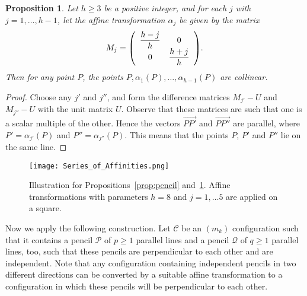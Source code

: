 \documentclass[reqno,12pt]{amsart}
\theoremstyle{plain}
\newtheorem{prop}[theorem]{Proposition}
\theoremstyle{definition}
\theoremstyle{remark}
\newcommand{\mc}[1]{\mathcal{#1}}
\newenvironment{matr}[1]{\left( \begin{array}{#1}}{\end{array}\right)}
\begin{document}
\begin{prop} \label{prop:series}
Let $h\ge3$ be a positive integer, and for each $j$ with $j=1,\dots,h-1$, let the affine transformation $\alpha_j$
be given by the matrix 
\begin{equation} \label{matrix}
M_j =
\begin{matr}{cc}
\displaystyle\frac{h-j}{h}&0\\0&\displaystyle\frac{h+j}{h}
\end{matr}.
\end{equation}
Then for any point $P$, the points $P, \alpha_1(P),\dots,\alpha_{h-1}(P)$ are collinear.
\end{prop}
%
\begin{proof}
Choose any $j'$ and $j''$, and form the difference matrices $M_{j'}-U$ and $M_{j''}-U$ with the unit matrix $U$.
Observe that these matrices are such that one is a scalar multiple of the other. Hence the vectors
$\overrightarrow{PP'}$ and $\overrightarrow{PP''}$ are parallel, where $P'=\alpha_{j'}(P)$ and 
$P''=\alpha_{j''}(P)$. This means that the points $P$, $P'$ and $P''$ lie on the same line.
%
\end{proof}
\medskip

%
\begin{figure}[h!]
\begin{center}
\texttt{[image: Series\_of\_Affinities.png]}
\caption{Illustration for Propositions~\ref{prop:pencil} and~\ref{prop:series}. 
             Affine transformations with parameters $h=8$ and $j=1,\dots 5$ are applied on a square.}
\label{fig:series}
\end{center}
\end{figure}

Now we apply the following construction. Let $\mathcal C$ be an $(m_k)$ configuration such that it contains a pencil $\mc P$ of 
$p\ge1$ parallel lines and a pencil $\mc Q$ of $q\ge1$ parallel lines, too, such that these pencils are perpendicular to each other and are independent.%
Note that any configuration containing independent pencils in two different directions can be 
converted by a suitable affine transformation to a configuration in which these pencils will be perpendicular to each other.
\end{document}
